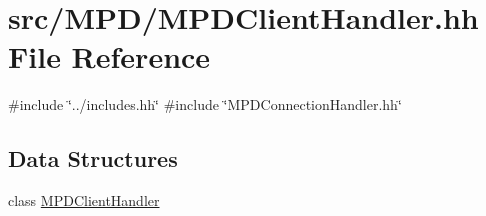 \hypertarget{MPDClientHandler_8hh}{
\section{src/\-M\-P\-D/\-M\-P\-D\-Client\-Handler.hh \-File \-Reference}
\label{MPDClientHandler_8hh}
}
{\ttfamily \#include \char`\"{}../includes.\-hh\char`\"{}}\*
{\ttfamily \#include \char`\"{}\-M\-P\-D\-Connection\-Handler.\-hh\char`\"{}}\*
\subsection*{\-Data \-Structures}
\begin{DoxyCompactItemize}
\item 
class \hyperlink{classMPDClientHandler}{\-M\-P\-D\-Client\-Handler}
\end{DoxyCompactItemize}
